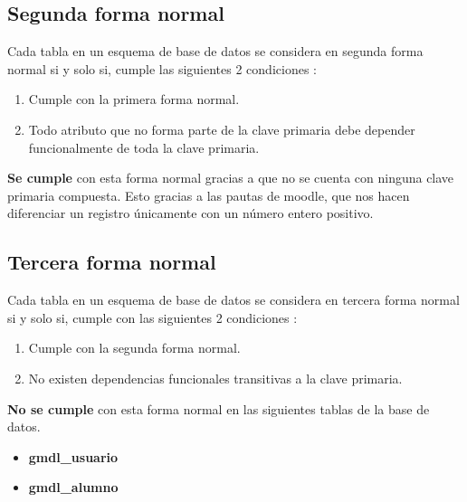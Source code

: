     
\subsection*{Segunda forma normal}
    
    Cada tabla en un esquema de base de datos se considera en segunda forma normal si y solo si, cumple las siguientes 2 condiciones \cite[pág. 159]{libroBaseDeDatosIngles}:
    \begin{enumerate}
        \item Cumple con la primera forma normal.
        \item Todo atributo que no forma parte de la clave primaria debe depender funcionalmente de toda la clave primaria.
    \end{enumerate}
    
    \noindent \textbf{Se cumple} con esta forma normal gracias a que no se cuenta con ninguna clave primaria compuesta. Esto gracias a las pautas de moodle, que nos hacen diferenciar un registro únicamente con un número entero positivo. 
    
\clearpage    
\subsection*{Tercera forma normal}
    
    Cada tabla en un esquema de base de datos se considera en tercera forma normal si y solo si, cumple con las siguientes 2 condiciones \cite[pág. 163]{libroBaseDeDatosIngles}:
    
    \begin{enumerate}
        \item Cumple con la segunda forma normal.
        \item No existen dependencias funcionales transitivas a la clave primaria.
    \end{enumerate}
    
    \noindent \textbf{No se cumple} con esta forma normal en las siguientes tablas de la base de datos.
    \begin{itemize}
        \item \textbf{gmdl\_usuario}
        \item \textbf{gmdl\_alumno}
    \end{itemize}
  
